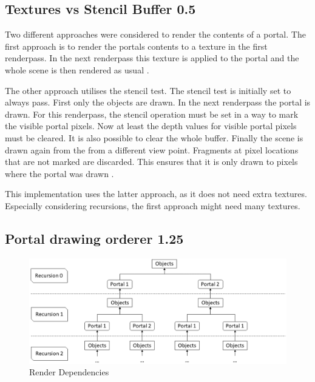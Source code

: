 \subsection{Textures vs Stencil Buffer 0.5}
\label{section:textursVsStencil}
Two different approaches were considered to render the contents of a portal. The first approach is to render the portals contents to a texture in the first renderpass. In the next renderpass this texture is applied to the portal and the whole scene is then rendered as usual \cite{schmalstieg:1999:sewing, lecture:portalProblems}.

The other approach utilises the stencil test. The stencil test is initially set to always pass. First only the objects are drawn. In the next renderpass the portal is drawn. For this renderpass, the stencil operation must be set in a way to mark the visible portal pixels. Now at least the depth values for visible portal pixels must be cleared. It is also possible to clear the whole buffer. Finally the scene is drawn again from the from a different view point. Fragments at pixel locations that are not marked are discarded. This ensures that it is only drawn to pixels where the portal was drawn \cites{schmalstieg:1999:sewing, lowe:2005:technique, lecture:portalProblems}.


This implementation uses the latter approach, as it does not need extra textures. Especially considering recursions, the first approach might need many textures. 

\subsection{Portal drawing orderer 1.25}

\begin{figure}[h]
	\includegraphics[width=\linewidth]{images/rendertree.png}
	\caption{Render Dependencies}
	\label{fig:rendertree}
\end{figure}



